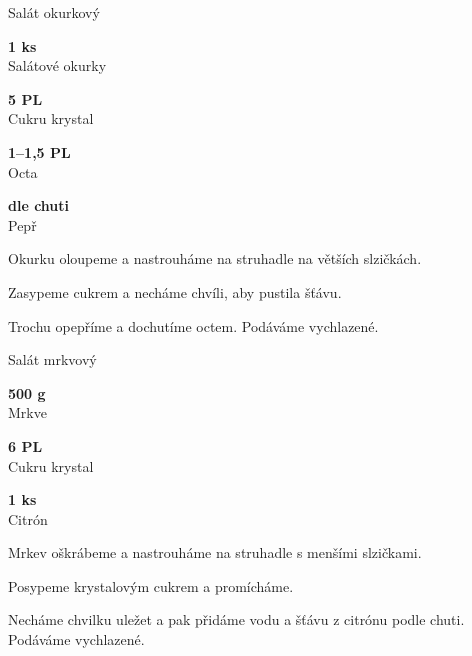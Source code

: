\documentclass[11pt,a4paper]{article}
\begin{document}
\begin{recipe}[SpringGreen]{Salát okurkový}
    \begin{ingredients}
        \item \parbox[t]{\linewidth}{\raggedright \piece \textbf{1 ks}\\ Salátové okurky}
        \item \parbox[t]{\linewidth}{\raggedright \spoon \textbf{5 PL}\\ Cukru krystal}
        \item \parbox[t]{\linewidth}{\raggedright \spoon \textbf{1--1,5 PL}\\ Octa}
        \item \parbox[t]{\linewidth}{\raggedright \indefinite \textbf{dle chuti}\\ Pepř}
    \end{ingredients}
    \begin{steps}
        \item Okurku oloupeme a nastrouháme na struhadle na větších slzičkách.
        \item Zasypeme cukrem a necháme chvíli, aby pustila šťávu.
        \item Trochu opepříme a dochutíme octem. Podáváme vychlazené.
    \end{steps}
\end{recipe}

\begin{recipe}[DarkOrange]{Salát mrkvový}
    \begin{ingredients}
        \item \parbox[t]{\linewidth}{\raggedright \weight \textbf{500 g}\\ Mrkve}
        \item \parbox[t]{\linewidth}{\raggedright \spoon \textbf{6 PL}\\ Cukru krystal}
        \item \parbox[t]{\linewidth}{\raggedright \piece \textbf{1 ks}\\ Citrón}
    \end{ingredients}
    \begin{steps}
        \item Mrkev oškrábeme a nastrouháme na struhadle s menšími slzičkami.
        \item Posypeme krystalovým cukrem a promícháme.
        \item Necháme chvilku uležet a pak přidáme vodu a šťávu z citrónu podle chuti. Podáváme vychlazené.
    \end{steps}
\end{recipe}
\end{document}
